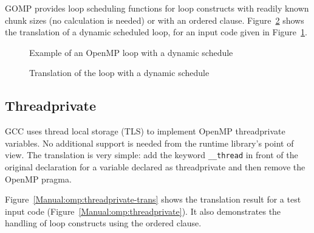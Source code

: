 GOMP provides loop scheduling functions for loop constructs with readily
known chunk sizes (no calculation is needed) or with an ordered clause. 
Figure~\ref{Manual:omp:ompfor4-trans} shows the translation of a dynamic scheduled loop,  for an input code given in
Figure~\ref{Manual:omp:ompfor4}. 

\lstset{language=C,basicstyle=\scriptsize}
\begin{figure}[htbp]
{\indent
  {\mySmallFontSize
    \begin{latexonly}
    
    \end{latexonly}
    \begin{htmlonly}
    
    \end{htmlonly}
  }
}
\caption{Example of an OpenMP loop with a dynamic schedule}
\label{Manual:omp:ompfor4}
\end{figure}

\begin{figure}[htbp]
{\indent
  {\mySmallFontSize
    \begin{latexonly}
    
    \end{latexonly}
    \begin{htmlonly}
    
    \end{htmlonly}
  }
}
\caption{Translation of the loop with a dynamic schedule}
\label{Manual:omp:ompfor4-trans}
\end{figure}

\clearpage
\subsection{Threadprivate}
GCC uses thread local storage (TLS) to implement OpenMP threadprivate variables. 
No additional support is needed from the runtime library's point of view. 
The translation is very simple: add the keyword \lstinline{__thread} in front of the original declaration for a variable declared as threadprivate and then remove the OpenMP pragma. 

Figure~\ref{Manual:omp:threadprivate-trans} shows the translation result for a test input code (Figure~\ref{Manual:omp:threadprivate}). It also demonstrates the handling of loop constructs using the ordered clause.

